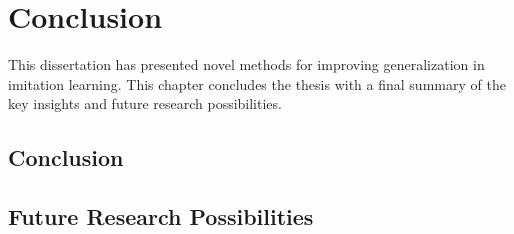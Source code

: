 \chapter{Conclusion\label{ch:Conclusion}}


\renewcommand{\SectionsDir}{Chapter7/Sections}
\renewcommand{\SubsectionsDir}{Chapter7/Sections/Subsections}
\renewcommand{\FigsDir}{Chapter7/Figs}
\renewcommand{\TablesDir}{Chapter7/Tables}


This dissertation has presented novel methods for improving generalization in imitation learning.
This chapter concludes the thesis with a final summary of the key insights and future research possibilities.


\section{Conclusion\label{ch:Conclusion:sec:Conclusion}}


\section{Future Research Possibilities\label{ch:Conclusion:sec:FutureResearch}}

